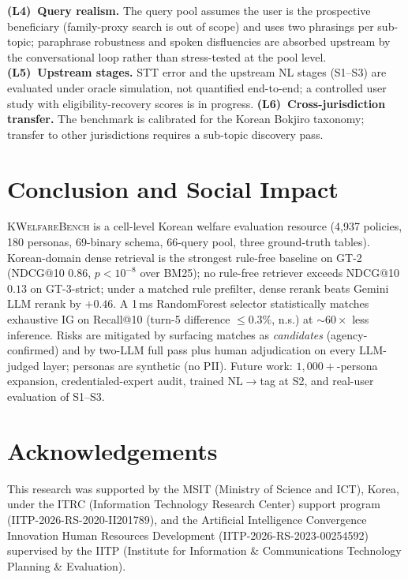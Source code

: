 \documentclass{article}
\newcommand{\kwbench}{\textsc{KWelfareBench}}
\newcommand{\npolicy}{4{,}937}
\newcommand{\npersona}{180}
\newcommand{\ndim}{69}
\begin{document}
\textbf{(L4)~Query realism.} The query pool assumes the user is the
prospective beneficiary (family-proxy search is out of scope) and uses
two phrasings per sub-topic; paraphrase robustness and spoken
disfluencies are absorbed upstream by the conversational loop rather
than stress-tested at the pool level.
\textbf{(L5)~Upstream stages.} STT error and the upstream NL stages
(S1--S3) are evaluated under oracle simulation, not quantified
end-to-end; a controlled user study with eligibility-recovery scores
is in progress.
\textbf{(L6)~Cross-jurisdiction transfer.} The benchmark is
calibrated for the Korean Bokjiro taxonomy; transfer to other
jurisdictions requires a sub-topic discovery pass.

\section{Conclusion and Social Impact}
\label{sec:conclusion}\label{sec:ethics}

\kwbench{} is a cell-level Korean welfare evaluation resource
(\npolicy{} policies, \npersona{} personas, \ndim{}-binary schema,
66-query pool, three ground-truth tables). Korean-domain dense
retrieval is the strongest rule-free baseline on GT-2 (NDCG@10
$0.86$, $p{<}10^{-8}$ over BM25); no rule-free retriever exceeds
NDCG@10 $0.13$ on GT-3-strict; under a matched rule prefilter,
dense rerank beats Gemini LLM rerank by $+0.46$. A 1\,ms
RandomForest selector statistically matches exhaustive IG on
Recall@10 (turn-5 difference $\leq{}0.3\%$, n.s.) at ${\sim}60\times$
less inference. Risks are mitigated by surfacing
matches as \emph{candidates} (agency-confirmed) and by two-LLM
full pass plus human adjudication on every LLM-judged layer;
personas are synthetic (no PII). Future work: $1{,}000{+}$-persona
expansion, credentialed-expert audit, trained NL$\to$tag at S2,
and real-user evaluation of S1--S3.

\section*{Acknowledgements}

This research was supported by the MSIT (Ministry of Science and ICT),
Korea, under the ITRC (Information Technology Research Center) support
program (IITP-2026-RS-2020-II201789), and the Artificial Intelligence
Convergence Innovation Human Resources Development
(IITP-2026-RS-2023-00254592) supervised by the IITP (Institute for
Information \& Communications Technology Planning \& Evaluation).
\end{document}
